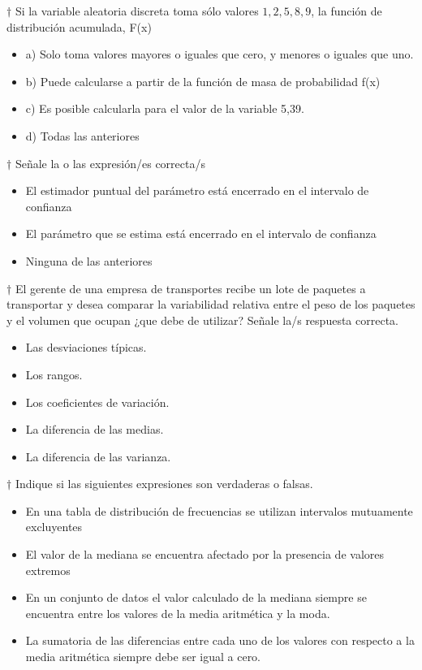 \documentclass[10pt,a4paper]{article}
\begin{document}
$\dagger$ Si la variable aleatoria discreta toma sólo valores ${1,2,5,8,9}$, la función de distribución acumulada, F(x)
\begin{itemize}
	\item a) Solo toma valores mayores o iguales que cero, y menores o iguales que uno.
	\item b) Puede calcularse a partir de la función de masa de probabilidad f(x)
	\item c) Es posible calcularla para el valor de la variable 5,39.
	\item d) Todas las anteriores
\end{itemize}

$\dagger$  Señale la o las expresión/es correcta/s
\begin{itemize}
	\renewcommand{\labelitemi}{\raisebox{-.25\height}{\huge$\square$}}
	\item El estimador puntual del parámetro está encerrado en el intervalo de confianza
	\item El parámetro que se estima está encerrado en el intervalo de confianza
	\item Ninguna de las anteriores
\end{itemize}

$\dagger$  El gerente de una empresa de transportes recibe un lote de paquetes a transportar y desea comparar la variabilidad relativa entre el peso de los paquetes y el volumen que ocupan ¿que debe de utilizar? Señale la/s respuesta correcta.

\begin{itemize}
	\item Las desviaciones típicas.
	\item Los rangos.
	\item Los coeficientes de variación.
	\item La diferencia de las medias.
	\item La diferencia de las varianza.
\end{itemize}

$\dagger$  Indique si las siguientes expresiones son verdaderas o falsas.
\begin{itemize}
	\renewcommand{\labelitemi}{\raisebox{-.25\height}{\huge$\square$}}
	\item En una tabla de distribución de frecuencias se utilizan intervalos mutuamente excluyentes
	\item El valor de la mediana se encuentra afectado por la presencia de valores extremos
	\item En un conjunto de datos el valor calculado de la mediana siempre se encuentra entre los valores de la media aritmética y la moda.
	\item La sumatoria de las diferencias entre cada uno de los valores con respecto a la media aritmética siempre debe ser igual a cero.
\end{itemize}
\end{document}
